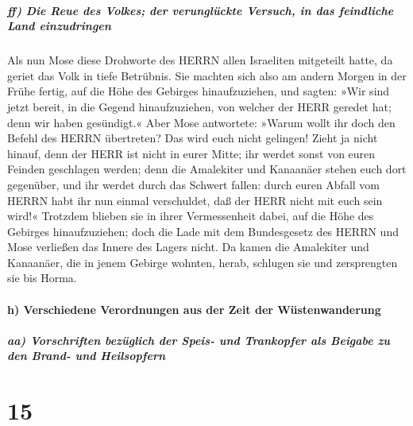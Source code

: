 \hypertarget{ff-die-reue-des-volkes-der-verungluxfcckte-versuch-in-das-feindliche-land-einzudringen}{%
\subparagraph{ff) Die Reue des Volkes; der verunglückte Versuch, in das
feindliche Land
einzudringen}\label{ff-die-reue-des-volkes-der-verungluxfcckte-versuch-in-das-feindliche-land-einzudringen}}

Als nun Mose diese Drohworte des HERRN allen Israeliten
mitgeteilt hatte, da geriet das Volk in tiefe Betrübnis.
Sie machten sich also am andern Morgen in der Frühe
fertig, auf die Höhe des Gebirges hinaufzuziehen, und sagten: »Wir sind
jetzt bereit, in die Gegend hinaufzuziehen, von welcher der HERR geredet
hat; denn wir haben gesündigt.« Aber Mose antwortete:
»Warum wollt ihr doch den Befehl des HERRN übertreten? Das wird euch
nicht gelingen! Zieht ja nicht hinauf, denn der HERR ist
nicht in eurer Mitte; ihr werdet sonst von euren Feinden geschlagen
werden; denn die Amalekiter und Kanaanäer stehen euch
dort gegenüber, und ihr werdet durch das Schwert fallen: durch euren
Abfall vom HERRN habt ihr nun einmal verschuldet, daß der HERR nicht mit
euch sein wird!« Trotzdem blieben sie in ihrer
Vermessenheit dabei, auf die Höhe des Gebirges hinaufzuziehen; doch die
Lade mit dem Bundesgesetz des HERRN und Mose verließen das Innere des
Lagers nicht. Da kamen die Amalekiter und Kanaanäer, die
in jenem Gebirge wohnten, herab, schlugen sie und zersprengten sie bis
Horma.

\hypertarget{h-verschiedene-verordnungen-aus-der-zeit-der-wuxfcstenwanderung}{%
\paragraph{h) Verschiedene Verordnungen aus der Zeit der
Wüstenwanderung}\label{h-verschiedene-verordnungen-aus-der-zeit-der-wuxfcstenwanderung}}

\hypertarget{aa-vorschriften-bezuxfcglich-der-speis--und-trankopfer-als-beigabe-zu-den-brand--und-heilsopfern}{%
\subparagraph{aa) Vorschriften bezüglich der Speis- und Trankopfer als
Beigabe zu den Brand- und
Heilsopfern}\label{aa-vorschriften-bezuxfcglich-der-speis--und-trankopfer-als-beigabe-zu-den-brand--und-heilsopfern}}

\hypertarget{section-14}{%
\section{15}\label{section-14}}

